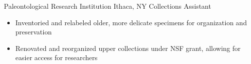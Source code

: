 
        {Paleontological Research Institution}
        {Ithaca, NY}
        {Collections Assistant}
        {}{
    \begin{itemize}
        \item Inventoried and relabeled older, more delicate specimens for organization and preservation
        \item Renovated and reorganized upper collections under NSF grant, allowing for easier access for researchers
    \end{itemize}
}

